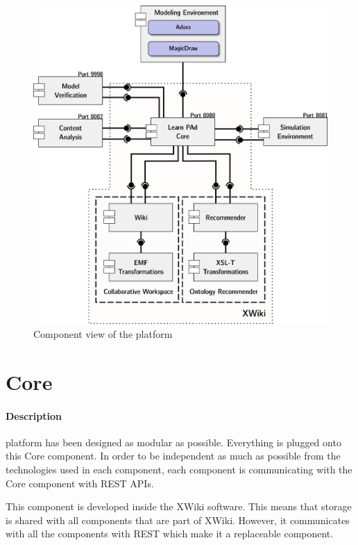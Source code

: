 \documentclass{learnpad}
\begin{document}
\begin{figure}[!htp]
	\centering
	\includegraphics[width=.6\paperwidth,keepaspectratio]{figures/component-view.png}
	\caption{Component view of the \learnpad platform}
	\label{fig:component-view}
\end{figure}

\section{\learnpad Core}\label{sec:core}
\paragraph{Description}
\learnpad platform has been designed as modular as possible.  Everything is
plugged onto this \learnpad Core component.  In order to be independent as much
as possible from the technologies used in each component, each component is
communicating with the \learnpad Core component with REST APIs.

This component is developed inside the XWiki software.  This means that storage
is shared with all components that are part of XWiki.  However, it communicates
with all the components with REST which make it a replaceable component.
\end{document}
